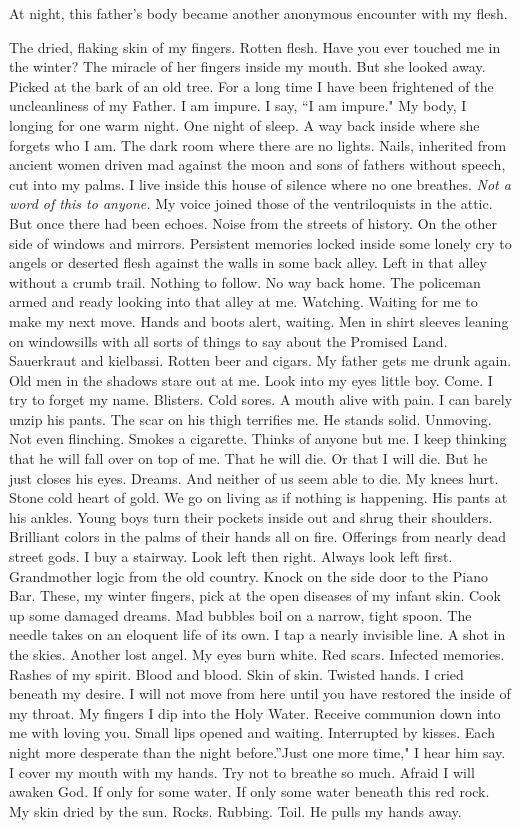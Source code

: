 \documentclass[
]{memoir}
\begin{document}
At night, this father's body became another anonymous encounter with my
flesh.

The dried, flaking skin of my fingers. Rotten flesh. Have you ever
touched me in the winter? The miracle of her fingers inside my mouth.
But she looked away. Picked at the bark of an old tree. For a long time
I have been frightened of the uncleanliness of my Father. I am impure. I
say, ``I am impure." My body, I longing for one warm night. One night of
sleep. A way back inside where she forgets who I am. The dark room where
there are no lights. Nails, inherited from ancient women driven mad
against the moon and sons of fathers without speech, cut into my palms.
I live inside this house of silence where no one breathes. \emph{Not a
word of this to anyone.} My voice joined those of the ventriloquists in
the attic. But once there had been echoes. Noise from the streets of
history. On the other side of windows and mirrors. Persistent memories
locked inside some lonely cry to angels or deserted flesh against the
walls in some back alley. Left in that alley without a crumb trail.
Nothing to follow. No way back home. The policeman armed and ready
looking into that alley at me. Watching. Waiting for me to make my next
move. Hands and boots alert, waiting. Men in shirt sleeves leaning on
windowsills with all sorts of things to say about the Promised Land.
Sauerkraut and kielbassi. Rotten beer and cigars. My father gets me
drunk again. Old men in the shadows stare out at me. Look into my eyes
little boy. Come. I try to forget my name. Blisters. Cold sores. A mouth
alive with pain. I can barely unzip his pants. The scar on his thigh
terrifies me. He stands solid. Unmoving. Not even flinching. Smokes a
cigarette. Thinks of anyone but me. I keep thinking that he will fall
over on top of me. That he will die. Or that I will die. But he just
closes his eyes. Dreams. And neither of us seem able to die. My knees
hurt. Stone cold heart of gold. We go on living as if nothing is
happening. His pants at his ankles. Young boys turn their pockets inside
out and shrug their shoulders. Brilliant colors in the palms of their
hands all on fire. Offerings from nearly dead street gods. I buy a
stairway. Look left then right. Always look left first. Grandmother
logic from the old country. Knock on the side door to the Piano Bar.
These, my winter fingers, pick at the open diseases of my infant skin.
Cook up some damaged dreams. Mad bubbles boil on a narrow, tight spoon.
The needle takes on an eloquent life of its own. I tap a nearly
invisible line. A shot in the skies. Another lost angel. My eyes burn
white. Red scars. Infected memories. Rashes of my spirit. Blood and
blood. Skin of skin. Twisted hands. I cried beneath my desire. I will
not move from here until you have restored the inside of my throat. My
fingers I dip into the Holy Water. Receive communion down into me with
loving you. Small lips opened and waiting. Interrupted by kisses. Each
night more desperate than the night before.''Just one more time," I hear
him say. I cover my mouth with my hands. Try not to breathe so much.
Afraid I will awaken God. If only for some water. If only some water
beneath this red rock. My skin dried by the sun. Rocks. Rubbing. Toil.
He pulls my hands away.
\end{document}
